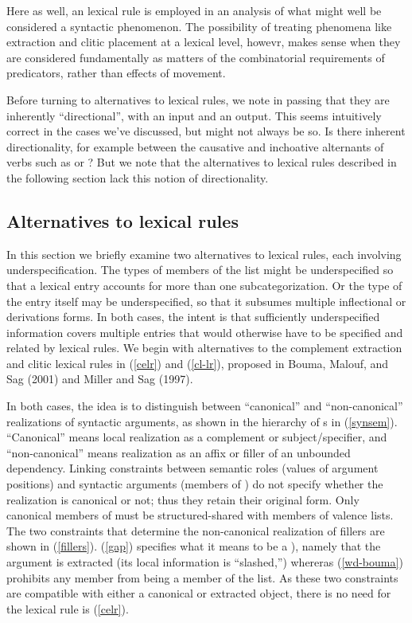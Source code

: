 \documentclass[output=paper]{langsci/langscibook}
\begin{document}
{Here as well, an lexical rule is employed in an analysis of what might well be considered a syntactic phenomenon.
The possibility of treating phenomena like extraction and clitic placement at a lexical level, howevr, makes sense when they are considered fundamentally as matters of the combinatorial requirements of predicators, rather than effects of movement.

Before turning to alternatives to lexical rules, we note in passing that they are inherently ``directional'', with an input and an output.
This seems intuitively correct in the cases we've discussed, but might not always be so.
Is there inherent directionality, for example between the causative and inchoative alternants of verbs such as  or ?
But we note that the alternatives to lexical rules described in the following section lack this notion of directionality.


\subsection{Alternatives to lexical rules}
\label{sec:alt}

In this section we briefly examine two alternatives to lexical rules, each involving underspecification. The types of members of the  list might be underspecified so that a lexical entry accounts for more than one subcategorization. Or the type of the entry itself may be underspecified, so that it subsumes multiple inflectional or derivations forms. In both cases, the intent is that sufficiently underspecified information covers multiple entries that would otherwise have to be specified and related by lexical rules. We begin with alternatives to the complement extraction and clitic lexical rules in (\ref{celr}) and (\ref{cl-lr}), proposed in Bouma, Malouf, and Sag (2001) and Miller and Sag (1997). 

In both cases, the idea is to distinguish between ``canonical'' and ``non-canonical'' realizations of syntactic arguments, as shown in the hierarchy of s in (\ref{synsem}). ``Canonical'' means local realization as a complement or subject/specifier, and ``non-canonical'' means realization as an affix or filler of an unbounded dependency. Linking constraints between semantic roles (values of argument positions) and syntactic arguments (members of ) do not specify whether the realization is canonical or not; thus they retain their original form. Only canonical members of  must be structured-shared with members of valence lists. The two constraints that determine the non-canonical realization of fillers are shown in (\ref{fillers}). (\ref{gap}) specifies what it means to be a ), namely that the argument is extracted (its local information is ``slashed,'') whereras (\ref{wd-bouma}) prohibits any  member from being a member of the  list. As these two constraints are compatible with either a canonical or extracted object, there is no need for the lexical rule is (\ref{celr}).

}
\end{document}
